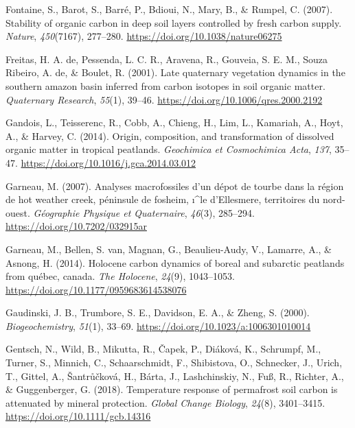 \documentclass[]{article}
\begin{document}
\leavevmode\hypertarget{ref-Fontaine_2007}{}%
Fontaine, S., Barot, S., Barré, P., Bdioui, N., Mary, B., \& Rumpel, C.
(2007). Stability of organic carbon in deep soil layers controlled by
fresh carbon supply. \emph{Nature}, \emph{450}(7167), 277--280.
\url{https://doi.org/10.1038/nature06275}

\leavevmode\hypertarget{ref-de_Freitas_2001}{}%
Freitas, H. A. de, Pessenda, L. C. R., Aravena, R., Gouveia, S. E. M.,
Souza Ribeiro, A. de, \& Boulet, R. (2001). Late quaternary vegetation
dynamics in the southern amazon basin inferred from carbon isotopes in
soil organic matter. \emph{Quaternary Research}, \emph{55}(1), 39--46.
\url{https://doi.org/10.1006/qres.2000.2192}

\leavevmode\hypertarget{ref-Gandois_2014}{}%
Gandois, L., Teisserenc, R., Cobb, A., Chieng, H., Lim, L., Kamariah,
A., Hoyt, A., \& Harvey, C. (2014). Origin, composition, and
transformation of dissolved organic matter in tropical peatlands.
\emph{Geochimica et Cosmochimica Acta}, \emph{137}, 35--47.
\url{https://doi.org/10.1016/j.gca.2014.03.012}

\leavevmode\hypertarget{ref-Garneau_2007}{}%
Garneau, M. (2007). Analyses macrofossiles d'un dépot de tourbe dans la
région de hot weather creek, péninsule de fosheim, ı\^{}le d'Ellesmere,
territoires du nord-ouest. \emph{Géographie Physique et Quaternaire},
\emph{46}(3), 285--294. \url{https://doi.org/10.7202/032915ar}

\leavevmode\hypertarget{ref-Garneau_2014}{}%
Garneau, M., Bellen, S. van, Magnan, G., Beaulieu-Audy, V., Lamarre, A.,
\& Asnong, H. (2014). Holocene carbon dynamics of boreal and subarctic
peatlands from québec, canada. \emph{The Holocene}, \emph{24}(9),
1043--1053. \url{https://doi.org/10.1177/0959683614538076}

\leavevmode\hypertarget{ref-Gaudinski_2000}{}%
Gaudinski, J. B., Trumbore, S. E., Davidson, E. A., \& Zheng, S. (2000).
\emph{Biogeochemistry}, \emph{51}(1), 33--69.
\url{https://doi.org/10.1023/a:1006301010014}

\leavevmode\hypertarget{ref-Gentsch_2018}{}%
Gentsch, N., Wild, B., Mikutta, R., Čapek, P., Diáková, K., Schrumpf,
M., Turner, S., Minnich, C., Schaarschmidt, F., Shibistova, O.,
Schnecker, J., Urich, T., Gittel, A., Šantrůčková, H., Bárta, J.,
Lashchinskiy, N., Fuß, R., Richter, A., \& Guggenberger, G. (2018).
Temperature response of permafrost soil carbon is attenuated by mineral
protection. \emph{Global Change Biology}, \emph{24}(8), 3401--3415.
\url{https://doi.org/10.1111/gcb.14316}
\end{document}
